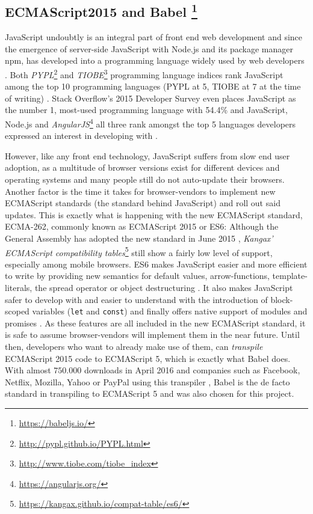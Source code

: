 \subsection[ECMAScript2015 and Babel]%
             {ECMAScript2015 and Babel%
             \protect\footnote{\url{https://babeljs.io/}}}%
\label{sec:implementation-technologies-es6}
JavaScript undoubtly is an integral part of front end web development and since the emergence of server-side JavaScript with Node.js and its package manager npm, has developed into a programming language widely used by web developers \cite{gpm-meta-transcompiler}. Both \emph{PYPL}\footnote{\url{http://pypl.github.io/PYPL.html}} and \emph{TIOBE}\footnote{\url{http://www.tiobe.com/tiobe_index}} programming language indices rank JavaScript among the top 10 programming languages (PYPL at 5, TIOBE at 7 at the time of writing) \cite{gpm-meta-transcompiler}. Stack Overflow's 2015 Developer Survey even places JavaScript as the number 1, most-used programming language with 54.4\% and JavaScript, Node.js and \emph{AngularJS}\footnote{\url{https://angularjs.org/}} all three rank amongst the top 5 languages developers expressed an interest in developing with \cite{stackoverflow-developer-survey}.

However, like any front end technology, JavaScript suffers from slow end user adoption, as a multitude of browser versions exist for different devices and operating systems and many people still do not auto-update their browsers. Another factor is the time it takes for browser-vendors to implement new ECMAScript standards (the standard behind JavaScript) and roll out said updates. This is exactly what is happening with the new ECMAScript standard, ECMA-262, commonly known as ECMAScript 2015 or ES6: Although the General Assembly has adopted the new standard in June 2015 \cite{ecma2015}, \emph{Kangax' ECMAScript compatibility tables}\footnote{\url{https://kangax.github.io/compat-table/es6/}} still show a fairly low level of support, especially among mobile browsers. ES6 makes JavaScript easier and more efficient to write by providing new semantics for default values, arrow-functions, template-literals, the spread operator or object destructuring \cite{es6}. It also makes JavaScript safer to develop with and easier to understand with the introduction of block-scoped variables (\texttt{let} and \texttt{const}) and finally offers native support of modules and promises \cite{es6}.
As these features are all included in the new ECMAScript standard, it is safe to assume browser-vendors will implement them in the near future. Until then, developers who want to already make use of them, can \emph{transpile} ECMAScript 2015 code to ECMAScript 5, which is exactly what Babel does. With almost $750.000$ downloads in April 2016 \cite{npm-babel} and companies such as Facebook, Netflix, Mozilla, Yahoo or PayPal using this transpiler \cite{babel-users}, Babel is the de facto standard in transpiling to ECMAScript 5 and was also chosen for this project.

